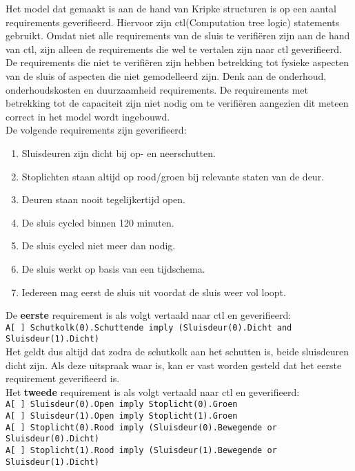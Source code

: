 \documentclass[../verslag.tex]{subfiles}
\begin{document}
Het model dat gemaakt is aan de hand van Kripke structuren is op een aantal requirements geverifieerd.
Hiervoor zijn ctl(Computation tree logic) statements gebruikt.
Omdat niet alle requirements van de sluis te verifiëren zijn aan de hand van ctl, zijn alleen de requirements die wel te vertalen zijn naar ctl geverifieerd.
De requirements die niet te verifiëren zijn hebben betrekking tot fysieke aspecten van de sluis of aspecten die niet gemodelleerd zijn.
Denk aan de onderhoud, onderhoudskosten en duurzaamheid requirements. 
De requirements met betrekking tot de capaciteit zijn niet nodig om te verifiëren aangezien dit meteen correct in het model wordt ingebouwd. \\
De volgende requirements zijn geverifieerd:
\begin{enumerate}
    \item Sluisdeuren zijn dicht bij op- en neerschutten.
    \item Stoplichten staan altijd op rood/groen bij relevante staten van de deur.
    \item Deuren staan nooit tegelijkertijd open.  
    \item De sluis cycled binnen 120 minuten.
    \item De sluis cycled niet meer dan nodig.
    \item De sluis werkt op basis van een tijdschema.
    \item Iedereen mag eerst de sluis uit voordat de sluis weer vol loopt.
\end{enumerate}

De \textbf{eerste} requirement is als volgt vertaald naar ctl en geverifieerd: \\
\verb|A[ ] Schutkolk(0).Schuttende imply (Sluisdeur(0).Dicht and Sluisdeur(1).Dicht)| \\


Het geldt dus altijd dat zodra de schutkolk aan het schutten is, beide sluisdeuren dicht zijn.
Als deze uitspraak waar is, kan er vast worden gesteld dat het eerste requirement geverifieerd is. \\

Het \textbf{tweede} requirement is als volgt vertaald naar ctl en geverifieerd: \\
\verb|A[ ] Sluisdeur(0).Open imply Stoplicht(0).Groen|  \\
\verb|A[ ] Sluisdeur(1).Open imply Stoplicht(1).Groen| \\
\verb|A[ ] Stoplicht(0).Rood imply (Sluisdeur(0).Bewegende or Sluisdeur(0).Dicht)| \\
\verb|A[ ] Stoplicht(1).Rood imply (Sluisdeur(1).Bewegende or Sluisdeur(1).Dicht)| \\
\end{document}
